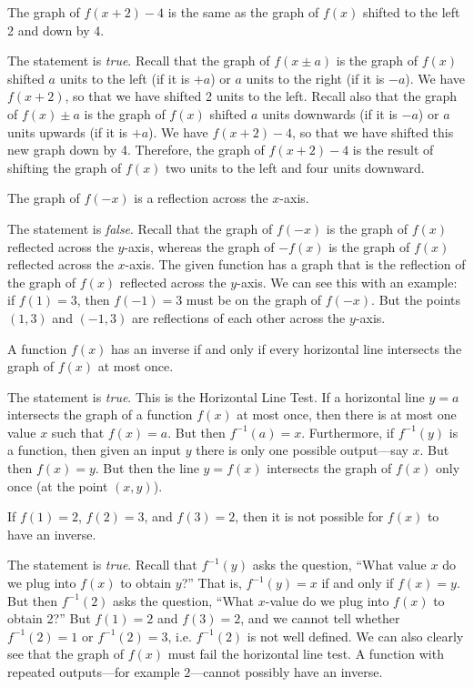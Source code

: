\documentclass[11pt,letterpaper]{article}
\begin{document}
 The graph of $f(x + 2) - 4$ is the same as the graph of $f(x)$ shifted to the left 2 and down by 4. \pspace

\sol The statement is \textit{true}. Recall that the graph of $f(x \pm a)$ is the graph of $f(x)$ shifted $a$ units to the left (if it is $+ a$) or $a$ units to the right (if it is $-a$). We have $f(x + 2)$, so that we have shifted 2 units to the left. Recall also that the graph of $f(x) \pm a$ is the graph of $f(x)$ shifted $a$ units downwards (if it is $-a$) or $a$ units upwards (if it is $+a$). We have $f(x + 2) - 4$, so that we have shifted this new graph down by 4. Therefore, the graph of $f(x + 2) - 4$ is the result of shifting the graph of $f(x)$ two units to the left and four units downward. \pvspace{1.3cm}



 The graph of $f(-x)$ is a reflection across the $x$-axis. \pspace

\sol The statement is \textit{false}. Recall that the graph of $f(-x)$ is the graph of $f(x)$ reflected across the $y$-axis, whereas the graph of $-f(x)$ is the graph of $f(x)$ reflected across the $x$-axis. The given function has a graph that is the reflection of the graph of $f(x)$ reflected across the $y$-axis. We can see this with an example: if $f(1)= 3$, then $f(-1)= 3$ must be on the graph of $f(-x)$. But the points $(1, 3)$ and $(-1, 3)$ are reflections of each other across the $y$-axis. \pvspace{1.3cm}



 A function $f(x)$ has an inverse if and only if every horizontal line intersects the graph of $f(x)$ at most once. \pspace

\sol The statement is \textit{true}. This is the Horizontal Line Test. If a horizontal line $y= a$ intersects the graph of a function $f(x)$ at most once, then there is at most one value $x$ such that $f(x)= a$. But then $f^{-1}(a)= x$. Furthermore, if $f^{-1}(y)$ is a function, then given an input $y$ there is only one possible output---say $x$. But then $f(x)= y$. But then the line $y= f(x)$ intersects the graph of $f(x)$ only once (at the point $(x, y)$). \pvspace{1.3cm}



 If $f(1)= 2$, $f(2)= 3$, and $f(3)= 2$, then it is not possible for $f(x)$ to have an inverse. \pspace

\sol The statement is \textit{true}. Recall that $f^{-1}(y)$ asks the question, ``What value $x$ do we plug into $f(x)$ to obtain $y$?'' That is, $f^{-1}(y)= x$ if and only if $f(x)= y$. But then $f^{-1}(2)$ asks the question, ``What $x$-value do we plug into $f(x)$ to obtain 2?'' But $f(1)= 2$ and $f(3)= 2$, and we cannot tell whether $f^{-1}(2)= 1$ or $f^{-1}(2)= 3$, i.e. $f^{-1}(2)$ is not well defined. We can also clearly see that the graph of $f(x)$ must fail the horizontal line test. A function with repeated outputs---for example $2$---cannot possibly have an inverse. \pvspace{1.3cm}
\end{document}
